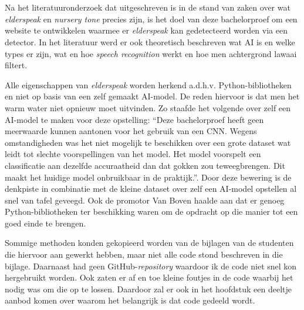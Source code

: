 
\chapter{}
\label{ch:methodologie}


Na het literatuuronderzoek dat uitgeschreven is in de stand van zaken over wat \textit{elderspeak} en \textit{nursery tone} precies zijn, is het doel van deze bachelorproef om een website te ontwikkelen  waarmee er \textit{elderspeak} kan gedetecteerd worden via een detector. In het literatuur werd er ook theoretisch beschreven wat AI is en welke types er zijn, wat en hoe \textit{speech recognition} werkt en hoe men achtergrond lawaai filtert.

Alle eigenschappen van \textit{elderspeak} worden herkend a.d.h.v. Python-bibliotheken en niet op basis van een zelf gemaakt AI-model. De reden hiervoor is dat men het warm water niet opnieuw moet uitvinden. Zo staafde \textcite{Beeckman2021} het volgende over zelf een AI-model te maken voor deze opstelling: ``Deze bachelorproef heeft geen meerwaarde kunnen aantonen voor het gebruik van een CNN. Wegens omstandigheden was het niet mogelijk te beschikken over een grote dataset wat leidt tot slechte voorspellingen van het model. Het model voorspelt een classificatie aan dezelfde accuraatheid dan dat gokken zou teweegbrengen. Dit maakt het huidige model onbruikbaar in de praktijk.''. Door deze bewering is de denkpiste in combinatie met de kleine dataset over zelf een AI-model opstellen al snel van tafel geveegd. Ook de promotor Van Boven haalde aan dat er genoeg Python-bibliotheken ter beschikking waren om de opdracht op die manier tot een goed einde te brengen.

Sommige methoden konden gekopieerd worden van de bijlagen van de studenten die hiervoor aan gewerkt hebben, maar niet alle code stond beschreven in die bijlage. Daarnaast had \textcite{Standaert2021} geen GitHub-\textit{repository} waardoor ik de code niet snel kon hergebruikt worden. Ook zaten er af en toe kleine foutjes in de code waarbij het nodig was om die op te lossen. Daardoor zal er ook in het hoofdstuk een deeltje aanbod komen over waarom het belangrijk is dat code gedeeld wordt.

